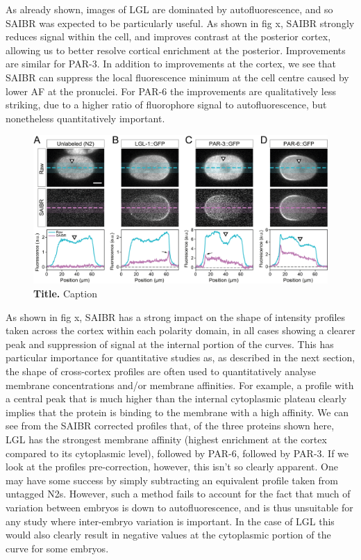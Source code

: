 \documentclass[12pt]{"article"}
\newcommand{\mycaption}[2]{\caption[#1]{\textbf{#1.} #2}}
\begin{document}
As already shown, images of LGL are dominated by autofluorescence, and so SAIBR was expected to be particularly useful. As shown in fig x, SAIBR strongly reduces signal within the cell, and improves contrast at the posterior cortex, allowing us to better resolve cortical enrichment at the posterior. Improvements are similar for PAR-3. In addition to improvements at the cortex, we see that SAIBR can suppress the local fluorescence minimum at the cell centre caused by lower AF at the pronuclei. For PAR-6 the improvements are qualitatively less striking, due to a higher ratio of fluorophore signal to autofluorescence, but nonetheless quantitatively important.\\

\begin{figure}[!h]
\includegraphics[scale=0.9]{saibr_spatial_correction}
\setlength{\abovecaptionskip}{20pt}
\centering
\mycaption{Title}{Caption}
\end{figure}

As shown in fig x, SAIBR has a strong impact on the shape of intensity profiles taken across the cortex within each polarity domain, in all cases showing a clearer peak and suppression of signal at the internal portion of the curves. This has particular importance for quantitative studies as, as described in the next section, the shape of cross-cortex profiles are often used to quantitatively analyse membrane concentrations and/or membrane affinities. For example, a profile with a central peak that is much higher than the internal cytoplasmic plateau clearly implies that the protein is binding to the membrane with a high affinity. We can see from the SAIBR corrected profiles that, of the three proteins shown here, LGL has the strongest membrane affinity (highest enrichment at the cortex compared to its cytoplasmic level), followed by PAR-6, followed by PAR-3. If we look at the profiles pre-correction, however, this isn't so clearly apparent. One may have some success by simply subtracting an equivalent profile taken from untagged N2s. However, such a method fails to account for the fact that much of variation between embryos is down to autofluorescence, and is thus unsuitable for any study where inter-embryo variation is important. In the case of LGL this would also clearly result in negative values at the cytoplasmic portion of the curve for some embryos.\\
\end{document}
